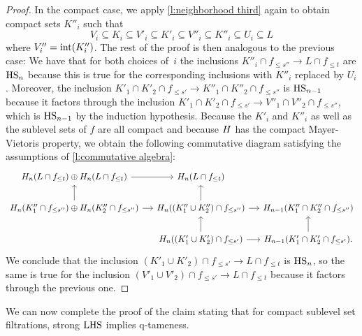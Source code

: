 \begin{proof}
	In the compact case, we apply \cref{l:neighborhood third} again to obtain compact sets $K''_i$ such that
	\begin{equation*}
	V_i \subseteq K_i \subseteq V'_i \subseteq K'_i \subseteq V''_i \subseteq K''_i \subseteq U_i \subseteq L
	\end{equation*}
	where $V''_i = \operatorname{int}(K''_i)$.
	The rest of the proof is then analogous to the previous case:
	We have that for both choices of~$i$ the inclusions
	$K''_i \cap f_{\leq s''} \to L \cap f_{\leq t}$
	are $\mathrm{HS}_n$ because this is true for the corresponding inclusions with $K''_i$ replaced by $U_i$.
	Moreover, the inclusion
	$K'_1 \cap K'_2 \cap f_{\leq s'} \to K''_1 \cap K''_2 \cap f_{\leq s''}$
	is $\mathrm{HS}_{n-1}$ because it factors through the inclusion
	$K'_1 \cap K'_2 \cap f_{\leq s'} \to V''_1 \cap V''_2 \cap f_{\leq s''}$,
	which is $\mathrm{HS}_{n-1}$ by the induction hypothesis.
	Because the $K'_i$ and $K''_i$ as well as the sublevel sets of $f$ are all compact and because $H$ has the compact Mayer-Vietoris property, we obtain the following commutative diagram satisfying the assumptions of \cref{l:commutative algebra}:
	\begin{equation*}
	\begin{tikzcd}[column sep=small]
	\H_n(L \cap f_{\leq t}) \oplus \H_n(L \cap f_{\leq t}) \arrow[r] &
	\H_n(L \cap f_{\leq t}) & \\
	\H_{n}(K''_1 \cap f_{\leq s''}) \oplus \H_n(K''_2 \cap f_{\leq s''}) \arrow[r] \arrow[u] & 
	\H_{n}((K''_1 \cup K''_2) \cap f_{\leq s''}) \arrow[r] \arrow[u] &
	\H_{n-1}(K''_1 \cap K''_2 \cap f_{\leq s''}) \\ & 
	\H_{n}((K'_1 \cup K'_2) \cap f_{\leq s'}) \arrow[r] \arrow[u] &
	\H_{n-1}(K'_1 \cap K'_2 \cap f_{\leq s'}). \arrow[u]
	\end{tikzcd}
	\end{equation*}
	We conclude that the inclusion 
	$\left(K'_1 \cup K'_2 \right) \cap f_{\leq s'} \to L \cap f_{\leq t}$
	is $\mathrm{HS}_n$, so the same is true for the inclusion
	$\left(V'_1 \cup V'_2 \right) \cap f_{\leq s'} \to L \cap f_{\leq t}$ 
	because it factors through the previous one.
\end{proof}

We can now complete the proof of the claim stating that for compact sublevel set filtrations, strong $\mathrm{LHS}$ implies q-tameness.

